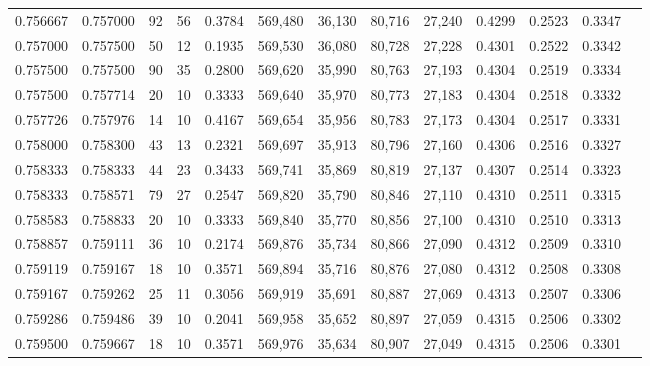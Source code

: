 \begin{tabular}{rrrrrrrrrrrrr}
0.756667 & 0.757000 &    92 &  56 &                                     0.3784 & 569,480 &  36,130 &  80,716 &  27,240 & 0.4299 & 0.2523 & 0.3347 \\
0.757000 & 0.757500 &    50 &  12 &                                     0.1935 & 569,530 &  36,080 &  80,728 &  27,228 & 0.4301 & 0.2522 & 0.3342 \\
0.757500 & 0.757500 &    90 &  35 &                                     0.2800 & 569,620 &  35,990 &  80,763 &  27,193 & 0.4304 & 0.2519 & 0.3334 \\
0.757500 & 0.757714 &    20 &  10 &                                     0.3333 & 569,640 &  35,970 &  80,773 &  27,183 & 0.4304 & 0.2518 & 0.3332 \\
0.757726 & 0.757976 &    14 &  10 &                                     0.4167 & 569,654 &  35,956 &  80,783 &  27,173 & 0.4304 & 0.2517 & 0.3331 \\
0.758000 & 0.758300 &    43 &  13 &                                     0.2321 & 569,697 &  35,913 &  80,796 &  27,160 & 0.4306 & 0.2516 & 0.3327 \\
0.758333 & 0.758333 &    44 &  23 &                                     0.3433 & 569,741 &  35,869 &  80,819 &  27,137 & 0.4307 & 0.2514 & 0.3323 \\
0.758333 & 0.758571 &    79 &  27 &                                     0.2547 & 569,820 &  35,790 &  80,846 &  27,110 & 0.4310 & 0.2511 & 0.3315 \\
0.758583 & 0.758833 &    20 &  10 &                                     0.3333 & 569,840 &  35,770 &  80,856 &  27,100 & 0.4310 & 0.2510 & 0.3313 \\
0.758857 & 0.759111 &    36 &  10 &                                     0.2174 & 569,876 &  35,734 &  80,866 &  27,090 & 0.4312 & 0.2509 & 0.3310 \\
0.759119 & 0.759167 &    18 &  10 &                                     0.3571 & 569,894 &  35,716 &  80,876 &  27,080 & 0.4312 & 0.2508 & 0.3308 \\
0.759167 & 0.759262 &    25 &  11 &                                     0.3056 & 569,919 &  35,691 &  80,887 &  27,069 & 0.4313 & 0.2507 & 0.3306 \\
0.759286 & 0.759486 &    39 &  10 &                                     0.2041 & 569,958 &  35,652 &  80,897 &  27,059 & 0.4315 & 0.2506 & 0.3302 \\
0.759500 & 0.759667 &    18 &  10 &                                     0.3571 & 569,976 &  35,634 &  80,907 &  27,049 & 0.4315 & 0.2506 & 0.3301 \\

\end{tabular}
